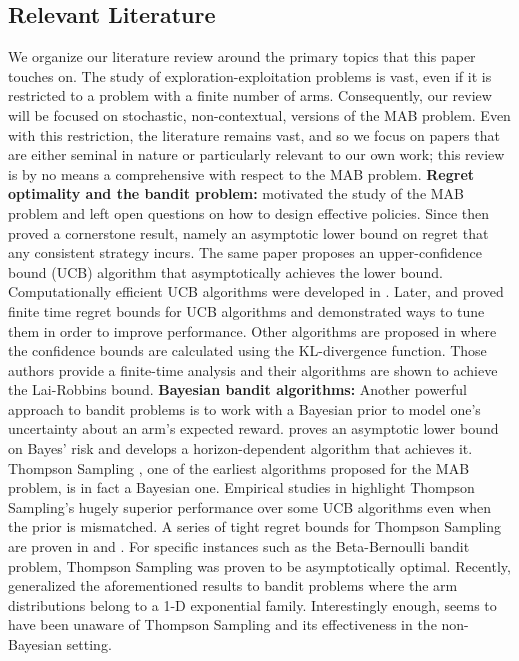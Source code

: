 \subsection{Relevant Literature}
We organize our literature review around the primary topics that this paper touches on. The study of exploration-exploitation problems is vast, even if it is restricted to a problem with a finite number of arms. Consequently, our review will be focused on stochastic, non-contextual, versions of the MAB problem. Even with this restriction, the literature remains vast, and so we focus on papers that are either seminal in nature or particularly relevant to our own work; this review is by no means a comprehensive with respect to the MAB problem. 
\newline
\noindent\textbf{\textsf{Regret optimality and the bandit problem: }}\cite{robbins1952some} motivated the study of the MAB problem and left open questions on how to design effective policies. Since then \cite{lai1985asymptotically} proved a cornerstone result, namely an asymptotic lower bound on regret that any consistent strategy incurs. The same paper proposes an upper-confidence bound (UCB) algorithm that asymptotically achieves the lower bound. Computationally efficient UCB algorithms were developed in \citep{agrawal1995sample, katehakis1995sequential}. Later, \cite{auer2002finite} and \cite{audibert2010regret} proved finite time regret bounds for UCB algorithms and demonstrated ways to tune them in order to improve performance. Other algorithms are proposed in \citep{garivier2011kl,maillard2011finite} where the confidence bounds are calculated using the KL-divergence function. Those authors provide a finite-time analysis and their algorithms are shown to achieve the Lai-Robbins bound.
\newline
\noindent\textbf{\textsf{Bayesian bandit algorithms: }} Another powerful approach to bandit problems is to work with a Bayesian prior to model one's uncertainty about an arm's expected reward. \cite{lai1987adaptive}  proves an asymptotic lower bound on Bayes' risk and develops a horizon-dependent algorithm that achieves it.
Thompson Sampling \citep{thompson1933likelihood}, one of the earliest algorithms proposed for the MAB problem, is in fact a Bayesian one. Empirical studies in \citep{chapelle2011empirical,scott2010modern} highlight Thompson Sampling's hugely superior performance over some UCB algorithms even when the prior is mismatched. A series of tight regret bounds for Thompson Sampling are proven in \citep{agrawalanalysis,agrawal2013further} and \citep{kaufmann2012thompson}. For specific instances such as the Beta-Bernoulli bandit problem, Thompson Sampling was proven to be asymptotically optimal. Recently, \cite{korda2013thompson} generalized the aforementioned results to bandit problems where the arm distributions belong to a 1-D exponential family. Interestingly enough, \cite{robbins1952some} seems to have been unaware of Thompson Sampling and its effectiveness in the non-Bayesian setting.

